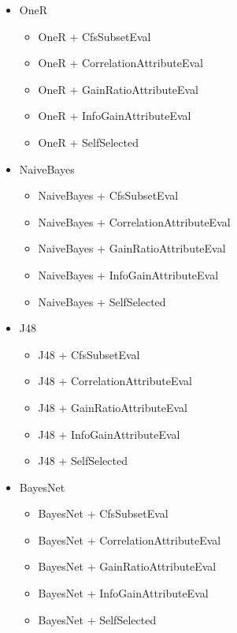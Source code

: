 \documentclass{article}
\begin{document}
\begin{itemize}
    \item OneR
    \begin{itemize}
        \item OneR + CfsSubsetEval
        \item OneR + CorrelationAttributeEval
        \item OneR + GainRatioAttributeEval
        \item OneR + InfoGainAttributeEval
        \item OneR + SelfSelected
    \end{itemize}

    \item NaiveBayes
    \begin{itemize}
        \item NaiveBayes + CfsSubsetEval
        \item NaiveBayes + CorrelationAttributeEval
        \item NaiveBayes + GainRatioAttributeEval
        \item NaiveBayes + InfoGainAttributeEval
        \item NaiveBayes + SelfSelected
    \end{itemize}

    \item J48
    \begin{itemize}
        \item J48 + CfsSubsetEval
        \item J48 + CorrelationAttributeEval
        \item J48 + GainRatioAttributeEval
        \item J48 + InfoGainAttributeEval
        \item J48 + SelfSelected
    \end{itemize}

    \item BayesNet
    \begin{itemize}
        \item BayesNet + CfsSubsetEval
        \item BayesNet + CorrelationAttributeEval
        \item BayesNet + GainRatioAttributeEval
        \item BayesNet + InfoGainAttributeEval
        \item BayesNet + SelfSelected
    \end{itemize}
\end{itemize}
\end{document}
